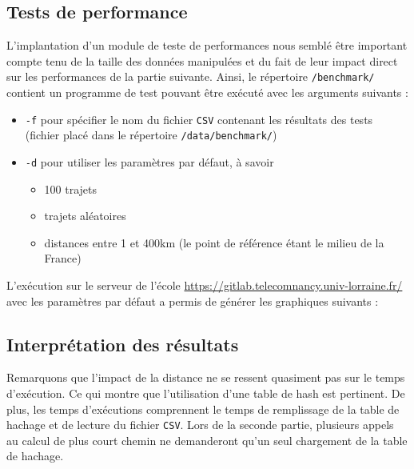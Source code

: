 \documentclass[a4paper, 12pt]{report}
\begin{document}
\subsection{Tests de performance}
L'implantation d'un module de teste de performances nous semblé être important compte tenu de la taille des données manipulées et du fait de leur impact direct sur les performances de la partie suivante. Ainsi, le répertoire \texttt{/benchmark/} contient un programme de test pouvant être exécuté avec les arguments suivants :
\begin{itemize}
    \item \texttt{-f} pour spécifier le nom du fichier \texttt{CSV} contenant les résultats des tests (fichier placé dans le répertoire \texttt{/data/benchmark/})
    \item \texttt{-d} pour utiliser les paramètres par défaut, à savoir
          \begin{itemize}
              \item 100 trajets
              \item trajets aléatoires
              \item distances entre 1 et 400km (le point de référence étant le milieu de la France)
          \end{itemize}
\end{itemize}
L'exécution sur le serveur de l'école \url{https://gitlab.telecomnancy.univ-lorraine.fr/} avec les paramètres par défaut a permis de générer les graphiques suivants :
\begin{figure}[H]
    \centering
\end{figure}
\subsection{Interprétation des résultats}
Remarquons que l'impact de la distance ne se ressent quasiment pas sur le temps d'exécution. Ce qui montre que l'utilisation d'une table de hash est pertinent. De plus, les temps d'exécutions comprennent le temps de remplissage de la table de hachage et de lecture du fichier \texttt{CSV}. Lors de la seconde partie, plusieurs appels au calcul de plus court chemin ne demanderont qu'un seul chargement de la table de hachage.\par\bigskip
\end{document}
